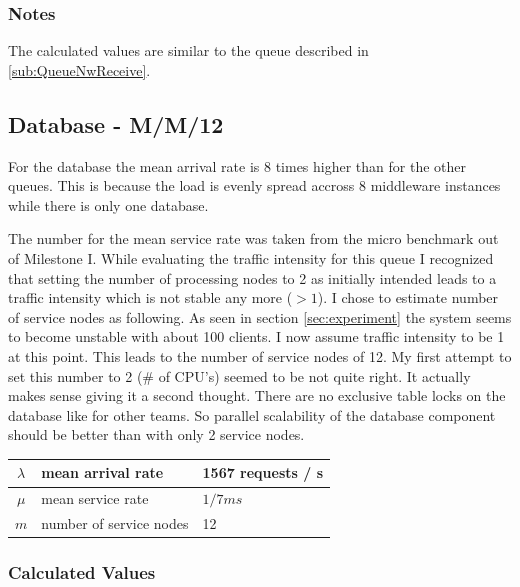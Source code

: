 \documentclass[a4paper]{article}
\begin{document}
\npnoround


\subsubsection{Notes}

The calculated values are similar to the queue described in \ref{sub:QueueNwReceive}. 


\subsection{Database - M/M/12}
\label{sub:QueueDatabase}

For the database the mean arrival rate is 8 times higher than for the other queues. This is because the load is evenly spread accross 8 middleware instances while there is only one database.

The number for the mean service rate was taken from the micro benchmark out of Milestone I. While evaluating the traffic intensity for this queue I recognized that setting the number of processing nodes to 2 as initially intended leads to a traffic intensity which is not stable any more ($>1$). I chose to estimate number of service nodes as following. As seen in section \ref{sec:experiment} the system seems to become unstable with about 100 clients. I now assume traffic intensity to be 1 at this point. This leads to the number of service nodes of 12. My first attempt to set this number to 2 (\# of CPU's) seemed to be not quite right. It actually makes sense giving it a second thought. There are no exclusive table locks on the database  like for other teams. So parallel scalability of the database component should be better than with only 2 service nodes.\\

\begin{tabular}{|c|l|l|}
\hline 
$\lambda$ & mean arrival rate & 1567 requests / s \\ 
\hline 
$\mu$ & mean service rate & $1/7ms$ \\ 
\hline 
$m$ & number of service nodes & 12 \\ 
\hline 
\end{tabular} 

\subsubsection{Calculated Values}
\end{document}
